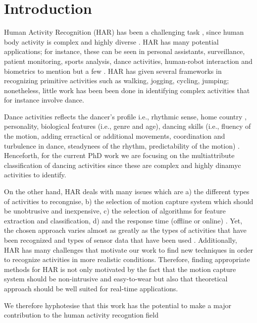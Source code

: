 \documentclass{sigchi}
\begin{document}


\section{Introduction}

Human Activity Recognition (HAR) has been a challenging task \cite{Aggarwal2004}, 
since human body activity is complex and highly diverse \cite{Kim2010}.
HAR has many potential applications; for instance, these can be seen in personal 
assistants, surveillance, patient monitoring, sports analysis, dance activities, 
human-robot interaction and biometrics to mention but a few \cite{Aggarwal2011}. 
HAR has given several frameworks in recognizing primitive activities 
such as walking, jogging, cycling, jumping; nonetheless, little work has been been
done in identifying complex activities that for instance involve dance. 

Dance activities reflects the dancer's profile i.e., rhythmic sense, 
home country \cite{Iwai2011}, personality, biological features (i.e., genre and age),
dancing skills (i.e., fluency of the motion, adding erractical or additional movements,
coordination and turbulence in dance, steadynees of the rhythm, predictability of 
the motion) \cite{GrammerK.ElisabethOberzaucher2011}.
Henceforth, for the current PhD work
we are focusing on the multiattribute classification of dancing activities 
since these are complex and  highly dinamyc activities to identify.

On the other hand, HAR deals with many issues which are
a) the different types of activities to recongnise,
b) the selection of motion capture system which should be unobtrusive and inexpensive,
c) the selection of algorithms for feature extraction and classification,
d) and the response time (offline or online) \cite{Lara2013}.
Yet, the chosen approach varies almost as greatly as the types of activities 
that have been recognized and types of sensor data that have been used 
\cite{Kim2010}. Additionally, HAR has many challenges that motivate our work 
to find new techniques in order to recognize activities in more realistic conditions. 
Therefore, finding appropriate methods for HAR is not only motivated by the 
fact that the motion capture system should be non-intrusive and easy-to-wear
but also that theoretical approach should be well suited for real-time applications.


We therefore hyphotesise that this work has the potential to 
make a major contribution to the human activity recogntion field
\end{document}
